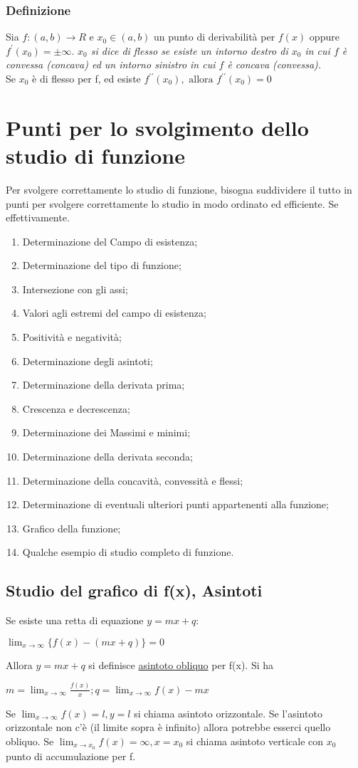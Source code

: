 \documentclass{book}
\begin{document}
\subsubsection{Definizione}
Sia $f:(a,b)\to R$ e $x_0\in (a,b)$ un punto di derivabilità per $f(x)$ oppure
$f^\prime(x_0)=\pm\infty$. \textit{$x_0$ si dice di flesso se esiste un intorno
destro di $x_0$ in cui $f$ è convessa (concava) ed un intorno sinistro in cui
$f$ è concava (convessa).}\\
Se $x_0$ è di flesso per f, ed esiste $f^{\prime\prime} (x_0),\text{ allora }
f^{\prime\prime}(x_0)=0$

\section{Punti per lo svolgimento dello studio di funzione}
Per svolgere correttamente lo studio di funzione, bisogna suddividere il tutto
in punti per svolgere correttamente lo studio in modo ordinato ed efficiente.
Se effettivamente.
\begin{enumerate}
	\item Determinazione del Campo di esistenza;
	\item Determinazione del tipo di funzione;
	\item Intersezione con gli assi;
	\item Valori agli estremi del campo di esistenza;
	\item Positività e negatività;
	\item Determinazione degli asintoti;
	\item Determinazione della derivata prima;
	\item Crescenza e decrescenza;
	\item Determinazione dei Massimi e minimi;
	\item Determinazione della derivata seconda;
	\item Determinazione della concavità, convessità e flessi;
	\item Determinazione di eventuali ulteriori punti appartenenti alla
		funzione;
	\item Grafico della funzione;
	\item Qualche esempio di studio completo di funzione.
\end{enumerate}
\subsection{Studio del grafico di f(x), Asintoti}
Se esiste una retta di equazione $y=mx+q$:
\begin{center}
	$\lim_{x\to\infty}\{f(x)- (mx+q)\}=0$
\end{center}
Allora $y=mx+q$ si definisce \underline{\color{red}asintoto obliquo} per f(x).
Si ha 
\begin{center}
	$m=\lim_{x\to \infty}\frac{f(x)}{x}; q=\lim_{x\to \infty} f(x)-mx$
\end{center}
Se $\lim_{x\to \infty}f(x)=l, y=l$ si chiama asintoto orizzontale.
Se l'asintoto orizzontale non c'è (il limite sopra è infinito) allora potrebbe
esserci quello obliquo. Se $\lim_{x\to x_0}f(x)=\infty, x=x_0$ si chiama
asintoto verticale con $x_0$ punto di accumulazione per f.
\end{document}
